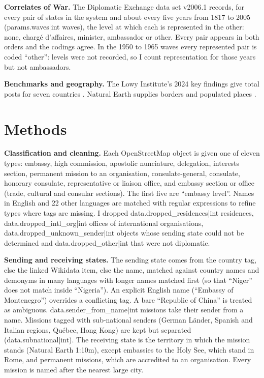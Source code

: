 \documentclass[11pt,a4paper]{article}
\begin{document}
\textbf{Correlates of War.} The Diplomatic Exchange data set v2006.1 \citep{bayer} records, for every pair of states in the system and about every five years from 1817 to 2005 ({{params.waves|int}} waves), the level at which each is represented in the other: none, charg\'e d'affaires, minister, ambassador or other. Every pair appears in both orders and the codings agree. In the 1950 to 1965 waves every represented pair is coded ``other'': levels were not recorded, so I count representation for those years but not ambassadors.

\textbf{Benchmarks and geography.} The Lowy Institute's 2024 key findings give total posts for seven countries \citep{lowy}. Natural Earth supplies borders and populated places \citep{naturalearth}.

\section{Methods}
\textbf{Classification and cleaning.} Each OpenStreetMap object is given one of eleven types: embassy, high commission, apostolic nunciature, delegation, interests section, permanent mission to an organisation, consulate-general, consulate, honorary consulate, representative or liaison office, and embassy section or office (trade, cultural and consular sections). The first five are ``embassy level''. Names in English and 22 other languages are matched with regular expressions to refine types where tags are missing. I dropped {{data.dropped_residences|int}} residences, {{data.dropped_intl_org|int}} offices of international organisations, {{data.dropped_unknown_sender|int}} objects whose sending state could not be determined and {{data.dropped_other|int}} that were not diplomatic.

\textbf{Sending and receiving states.} The sending state comes from the country tag, else the linked Wikidata item, else the name, matched against country names and demonyms in many languages with longer names matched first (so that ``Niger'' does not match inside ``Nigeria''). An explicit English name (``Embassy of Montenegro'') overrides a conflicting tag. A bare ``Republic of China'' is treated as ambiguous. {{data.sender_from_name|int}} missions take their sender from a name. Missions tagged with sub-national senders (German L\"ander, Spanish and Italian regions, Qu\'ebec, Hong Kong) are kept but separated ({{data.subnational|int}}). The receiving state is the territory in which the mission stands (Natural Earth 1:10m), except embassies to the Holy See, which stand in Rome, and permanent missions, which are accredited to an organisation. Every mission is named after the nearest large city.
\end{document}

